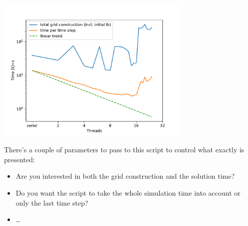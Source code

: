\begin{center}
  \includegraphics[width=0.7\textwidth]{80_postprocessing/distributed-memory-single-experiment.pdf}
\end{center}

\noindent
There's a couple of parameters to pass to this script to control what exactly is
presented:

\begin{itemize}
  \item Are you interested in both the grid construction and the solution time?
  \item Do you want the script to take the whole simulation time into account or
  only the last time step?
  \item \ldots
\end{itemize}


